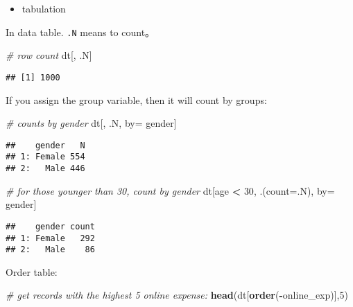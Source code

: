 \documentclass[
]{article}
\newenvironment{Shaded}{\begin{snugshade}}{\end{snugshade}}
\newcommand{\CommentTok}[1]{\textcolor[rgb]{0.56,0.35,0.01}{\textit{#1}}}
\newcommand{\DataTypeTok}[1]{\textcolor[rgb]{0.13,0.29,0.53}{#1}}
\newcommand{\DecValTok}[1]{\textcolor[rgb]{0.00,0.00,0.81}{#1}}
\newcommand{\KeywordTok}[1]{\textcolor[rgb]{0.13,0.29,0.53}{\textbf{#1}}}
\newcommand{\NormalTok}[1]{#1}
\newcommand{\OperatorTok}[1]{\textcolor[rgb]{0.81,0.36,0.00}{\textbf{#1}}}
\newcommand{\StringTok}[1]{\textcolor[rgb]{0.31,0.60,0.02}{#1}}
\providecommand{\tightlist}{%
  \setlength{\itemsep}{0pt}\setlength{\parskip}{0pt}}
\begin{document}
\begin{itemize}
\tightlist
\item
  tabulation
\end{itemize}

In data table. \texttt{.N} means to count。

\begin{Shaded}
\begin{Highlighting}[]
\CommentTok{# row count}
\NormalTok{dt[, .N] }
\end{Highlighting}
\end{Shaded}

\begin{verbatim}
## [1] 1000
\end{verbatim}

If you assign the group variable, then it will count by groups:

\begin{Shaded}
\begin{Highlighting}[]
\CommentTok{# counts by gender}
\NormalTok{dt[, .N, by=}\StringTok{ }\NormalTok{gender]  }
\end{Highlighting}
\end{Shaded}

\begin{verbatim}
##    gender   N
## 1: Female 554
## 2:   Male 446
\end{verbatim}

\begin{Shaded}
\begin{Highlighting}[]
\CommentTok{# for those younger than 30, count by gender}
\NormalTok{ dt[age }\OperatorTok{<}\StringTok{ }\DecValTok{30}\NormalTok{, .(}\DataTypeTok{count=}\NormalTok{.N), by=}\StringTok{ }\NormalTok{gender] }
\end{Highlighting}
\end{Shaded}

\begin{verbatim}
##    gender count
## 1: Female   292
## 2:   Male    86
\end{verbatim}

Order table:

\begin{Shaded}
\begin{Highlighting}[]
\CommentTok{# get records with the highest 5 online expense:}
\KeywordTok{head}\NormalTok{(dt[}\KeywordTok{order}\NormalTok{(}\OperatorTok{-}\NormalTok{online_exp)],}\DecValTok{5}\NormalTok{) }
\end{Highlighting}
\end{Shaded}
\end{document}
